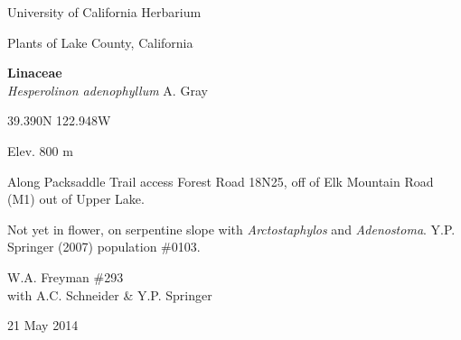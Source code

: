 \documentclass[letterpaper,10pt]{article}
\begin{document}
\begin{minipage}[t]{0.40\textwidth}

\begin{center}
University of California Herbarium \\
\begin{large}
Plants of Lake County, California \\
\end{large}
\vspace{\baselineskip}
\textbf{Linaceae} \\
\textit{Hesperolinon adenophyllum} A. Gray\\
\end{center}

\begin{footnotesize}

\begin{multicols}{2}
39.390\textdegree N 122.948\textdegree W
\columnbreak
\begin{flushright}
Elev. 800 m
\end{flushright}
\end{multicols}

Along Packsaddle Trail access Forest Road 18N25, off of Elk Mountain Road (M1) out of Upper Lake.
\vspace{\baselineskip}

Not yet in flower, on serpentine slope with \textit{Arctostaphylos} and \textit{Adenostoma}. Y.P. Springer (2007) population \#0103.

\begin{multicols}{2}
W.A. Freyman \#293 \\
with A.C. Schneider \& Y.P. Springer
\columnbreak
\begin{flushright}
21 May 2014
\end{flushright}
\end{multicols}

\end{footnotesize}

\end{minipage}

\vspace{2cm}
%
%

%
%
\end{document}
